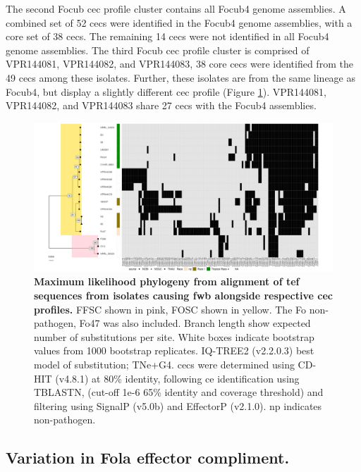 The second \ac{Focub} \ac{cec} profile cluster contains all \ac{Focub4} genome assemblies. A combined set of 52 \acp{cec} were identified in the \ac{Focub4} genome assemblies, with a core set of 38 \acp{cec}. The remaining  14 \acp{cec} were not identified in all \ac{Focub4} genome assemblies. The third  \ac{Focub} \ac{cec} profile cluster is comprised of  VPR144081, VPR144082, and VPR144083, 38 core \acp{cec} were identified from the 49 \acp{cec} among these isolates. Further, these isolates are from the same lineage as \ac{Focub4}, but display a slightly different \ac{cec} profile (Figure \ref{fig:MaeiHeatmap-banana}). VPR144081, VPR144082, and VPR144083 share 27 \acp{cec} with the \ac{Focub4} assemblies. 

\begin{figure}
    \centering
    \includegraphics[width=\textwidth]{Figures/HeatmapAndPhylo_BananaPathOnly.png}
    \captionsetup{width=24cm}
    \caption[Maximum likelihood phylogeny from alignment of \Acl{tef} sequences from isolates  causing \acl{fwb} alongside respective \acl{cec} profiles.]{\textbf{Maximum likelihood phylogeny from alignment of \Acf{tef} sequences from isolates causing \acl{fwb} alongside respective \acf{cec} profiles.} \ac{FFSC} shown in pink, \ac{FOSC} shown in yellow. The \ac{Fo} non-pathogen, Fo47 was also included. Branch length show expected number of substitutions per site. White boxes indicate bootstrap values from 1000 bootstrap replicates. IQ-TREE2 (v2.2.0.3) best model of substitution; TNe+G4. \Acp{cec} were determined using CD-HIT (v4.8.1) at 80\% identity, following \ac{ce} identification using TBLASTN, (cut-off 1e-6 65\% identity and coverage threshold) and filtering using SignalP (v5.0b) and EffectorP (v2.1.0). np indicates non-pathogen.}
    \label{fig:MaeiHeatmap-banana}
\end{figure}

\subsection{Variation in \acl{Fola} effector compliment.}

